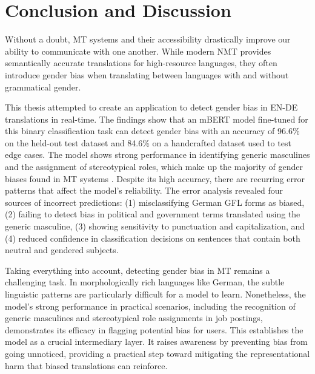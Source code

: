 \chapter{Conclusion and Discussion}
   Without a doubt, MT systems and their accessibility drastically improve our ability to communicate with one another. While modern NMT provides semantically accurate translations for high-resource languages, they often introduce gender bias when translating between languages with and without grammatical gender.

   This thesis attempted to create an application to detect gender bias in EN-DE translations in real-time. The findings show that an mBERT model fine-tuned for this binary classification task can detect gender bias with an accuracy of 96.6\% on the held-out test dataset and 84.6\% on a handcrafted dataset used to test edge cases. The model shows strong performance in identifying generic masculines and the assignment of stereotypical roles, which make up the majority of gender biases found in MT systems \parencite{lardelliBuildingBridgesDataset2024,stanovskyEvaluatingGenderBias2019,pratesAssessingGenderBias2019}. Despite its high accuracy, there are recurring error patterns that affect the model’s reliability. The error analysis revealed four sources of incorrect predictions: (1) misclassifying German GFL forms as biased, (2) failing to detect bias in political and government terms translated using the generic masculine, (3) showing sensitivity to punctuation and capitalization, and (4) reduced confidence in classification decisions on sentences that contain both neutral and gendered subjects.

   Taking everything into account, detecting gender bias in MT remains a challenging task. In morphologically rich languages like German, the subtle linguistic patterns are particularly difficult for a model to learn. Nonetheless, the model's strong performance in practical scenarios, including the recognition of generic masculines and stereotypical role assignments in job postings, demonstrates its efficacy in flagging potential bias for users. This establishes the model as a crucial intermediary layer. It raises awareness by preventing bias from going unnoticed, providing a practical step toward mitigating the representational harm that biased translations can reinforce.

